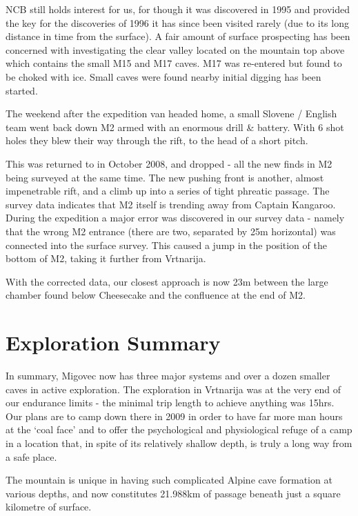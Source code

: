 NCB still holds interest for us, for though it was discovered in 1995
and provided the key for the discoveries of 1996 it has since been
visited rarely (due to its long distance in time from the surface). A
fair amount of surface prospecting has been concerned with investigating
the clear valley located on the mountain top above which contains the
small M15 and M17 caves. M17 was re-entered but found to be choked with
ice. Small caves were found nearby initial digging has been started.

The weekend after the expedition van headed home, a small Slovene /
English team went back down M2 armed with an enormous drill \& battery.
With 6 shot holes they blew their way through the rift, to the head of a
short pitch.

This was returned to in October 2008, and dropped - all the new finds in
M2 being surveyed at the same time. The new pushing front is another,
almost impenetrable rift, and a climb up into a series of tight phreatic
passage. The survey data indicates that M2 itself is trending away from
Captain Kangaroo. During the expedition a major error was discovered in
our survey data - namely that the wrong M2 entrance (there are two,
separated by 25m horizontal) was connected into the surface survey. This
caused a jump in the position of the bottom of M2, taking it further
from Vrtnarija.

With the corrected data, our closest approach is now 23m between the
large chamber found below Cheesecake and the confluence at the end of
M2.

\section{Exploration Summary}\label{exploration-summary}

In summary, Migovec now has three major systems and over a dozen smaller
caves in active exploration. The exploration in Vrtnarija was at the
very end of our endurance limits - the minimal trip length to achieve
anything was 15hrs. Our plans are to camp down there in 2009 in order to
have far more man hours at the `coal face' and to offer the
psychological and physiological refuge of a camp in a location that, in
spite of its relatively shallow depth, is truly a long way from a safe
place.

The mountain is unique in having such complicated Alpine cave formation
at various depths, and now constitutes 21.988km of passage beneath just
a square kilometre of surface.

